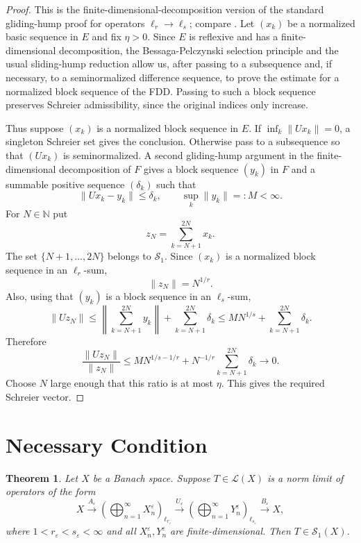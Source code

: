 \documentclass[11pt]{article}
\newtheorem{theorem}{Theorem}
\newcommand{\oplusell}[2]{\left(\bigoplus_{n=1}^{\infty} #1_n\right)_{\ell_{#2}}}
\begin{document}
\begin{proof}
This is the finite-dimensional-decomposition version of the standard
gliding-hump proof for operators $\ell_r\to\ell_s$; compare
\cite[Example 2.4]{ADST}.  Let $(x_k)$ be a normalized basic sequence in
$E$ and fix $\eta>0$.  Since $E$ is reflexive and has a finite-dimensional
decomposition, the Bessaga-Pelczynski selection principle and the usual
sliding-hump reduction allow us, after passing to a subsequence and, if
necessary, to a seminormalized difference sequence, to prove the estimate for
a normalized block sequence of the FDD.  Passing to such a block sequence
preserves Schreier admissibility, since the original indices only increase.

Thus suppose $(x_k)$ is a normalized block sequence in $E$.  If
$\inf_k\|Ux_k\|=0$, a singleton Schreier set gives the conclusion.  Otherwise
pass to a subsequence so that $(Ux_k)$ is seminormalized.  A second
gliding-hump argument in the finite-dimensional decomposition of $F$ gives a
block sequence $(y_k)$ in $F$ and a summable positive sequence $(\delta_k)$
such that
\[
  \|Ux_k-y_k\|\leq \delta_k,\qquad \sup_k\|y_k\|=:M<\infty .
\]
For $N\in\mathbb N$ put
\[
  z_N=\sum_{k=N+1}^{2N} x_k .
\]
The set $\{N+1,\ldots,2N\}$ belongs to $\mathcal S_1$.  Since $(x_k)$ is a
normalized block sequence in an $\ell_r$-sum,
\[
  \|z_N\|=N^{1/r}.
\]
Also, using that $(y_k)$ is a block sequence in an $\ell_s$-sum,
\[
  \|Uz_N\|
  \leq \left\|\sum_{k=N+1}^{2N} y_k\right\|
       +\sum_{k=N+1}^{2N}\delta_k
  \leq M N^{1/s}+\sum_{k=N+1}^{2N}\delta_k .
\]
Therefore
\[
  \frac{\|Uz_N\|}{\|z_N\|}
  \leq M N^{1/s-1/r}
      +N^{-1/r}\sum_{k=N+1}^{2N}\delta_k
  \longrightarrow 0.
\]
Choose $N$ large enough that this ratio is at most $\eta$.  This gives the
required Schreier vector.
\end{proof}

\section*{Necessary Condition}

\begin{theorem}\label{thm:necessary}
Let $X$ be a Banach space.  Suppose $T\in\mathcal L(X)$ is a norm limit of
operators of the form
\[
  X \xrightarrow{A_\varepsilon}
  \oplusell{X^\varepsilon}{r_\varepsilon}
  \xrightarrow{U_\varepsilon}
  \oplusell{Y^\varepsilon}{s_\varepsilon}
  \xrightarrow{B_\varepsilon}
  X,
\]
where $1<r_\varepsilon<s_\varepsilon<\infty$ and all
$X^\varepsilon_n,Y^\varepsilon_n$ are finite-dimensional.  Then
$T\in\mathcal S_1(X)$.
\end{theorem}
\end{document}
